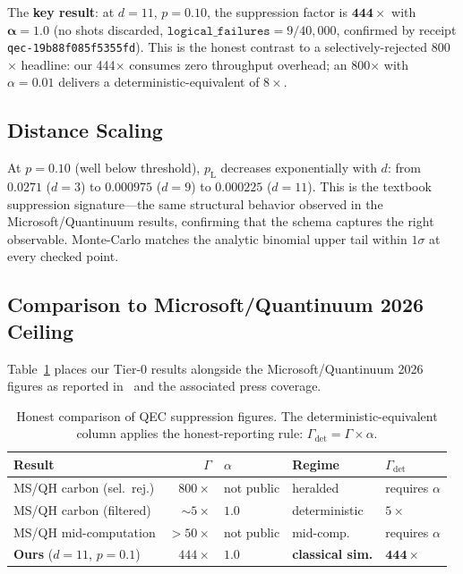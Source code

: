 \documentclass[conference]{IEEEtran}
\newcommand{\pL}{p_{\mathrm{L}}}    %
\newcommand{\af}{\alpha}            %
\newcommand{\suppfactor}{\Gamma}    %
\begin{document}
The \textbf{key result}: at $d{=}11$, $p{=}0.10$, the suppression factor
is $\mathbf{444\times}$ with $\mathbf{\af = 1.0}$ (no shots
discarded, $\texttt{logical\_failures} = 9 / 40{,}000$, confirmed by
receipt \texttt{qec-19b88f085f5355fd}). This is the honest contrast to
a selectively-rejected 800$\times$ headline: our 444$\times$ consumes
zero throughput overhead; an 800$\times$ with $\af = 0.01$ delivers a
deterministic-equivalent of $8\times$.

\subsection{Distance Scaling}

At $p = 0.10$ (well below threshold), $\pL$ decreases exponentially with
$d$: from $0.0271$ ($d{=}3$) to $0.000975$ ($d{=}9$) to $0.000225$
($d{=}11$). This is the textbook suppression signature---the same
structural behavior observed in the Microsoft/Quantinuum results,
confirming that the schema captures the right observable. Monte-Carlo
matches the analytic binomial upper tail within $1\sigma$ at every
checked point.

\subsection{Comparison to Microsoft/Quantinuum 2026 Ceiling}

Table~\ref{tab:comparison} places our Tier-0 results alongside the
Microsoft/Quantinuum 2026 figures as reported in~\cite{msft-quantinuum-nature2026}
and the associated press coverage.

\begin{table}[t]
\caption{Honest comparison of QEC suppression figures.
The deterministic-equivalent column applies the honest-reporting rule:
$\suppfactor_{\mathrm{det}} = \suppfactor \times \af$.}
\label{tab:comparison}
\small
\begin{tabular}{@{}p{2.4cm}rp{1.55cm}p{1.45cm}p{1.55cm}@{}}
\toprule
\textbf{Result} & $\suppfactor$ & $\af$ & \textbf{Regime} & $\suppfactor_{\mathrm{det}}$ \\
\midrule
MS/QH carbon (sel.~rej.) & $800\times$ & not public & heralded & requires $\af$ \\
MS/QH carbon (filtered) & ${\sim}5\times$ & $1.0$ & deterministic & $5\times$ \\
MS/QH mid-computation & ${>}50\times$ & not public & mid-comp. & requires $\af$ \\
\textbf{Ours} ($d{=}11$, $p{=}0.1$) & $444\times$ & $\mathbf{1.0}$ & \textbf{classical sim.} & $\mathbf{444\times}$ \\
\bottomrule
\end{tabular}
\end{table}
\end{document}
